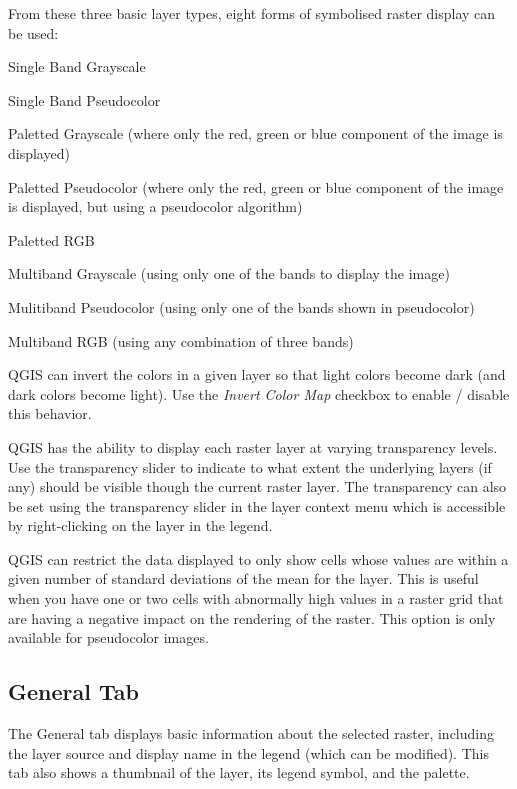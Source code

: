 From these three basic layer types, eight forms of symbolised raster display can
be used:
\begin{compactenum}

\item Single Band Grayscale
\item Single Band Pseudocolor
\item Paletted Grayscale (where only the red, green or blue component of the image is displayed)
\item Paletted Pseudocolor (where only the red, green or blue component of the image is displayed, but using a pseudocolor algorithm)
\item Paletted RGB
\item Multiband Grayscale (using only one of the bands to display the image)
\item Mulitiband Pseudocolor (using only one of the bands shown in pseudocolor)
\item Multiband RGB (using any combination of three bands)
\end{compactenum}
\smallskip
QGIS can invert the colors in a given layer so that light colors become dark
(and dark colors become light). Use the \textsl{Invert Color Map} checkbox to
enable / disable this behavior.

QGIS has the ability to display each raster layer at varying transparency
levels. Use the transparency slider to indicate to what extent the underlying layers (if any) should be visible though the current raster layer. The transparency can also be set using the transparency slider in the layer context menu which is accessible by right-clicking on the layer in the legend.

QGIS can restrict the data displayed to only show cells whose values are within
a given number of standard deviations of the mean for the
layer. This is useful when you have one or two cells with abnormally high values in a raster grid that are having a negative impact on the rendering of the raster. This option is only available for pseudocolor images.

\subsection{General Tab}
The General tab displays basic information about the selected raster, including
the layer source and  display name in the legend (which can be modified). This
tab also shows a thumbnail of the layer, its legend symbol, and the
palette.

